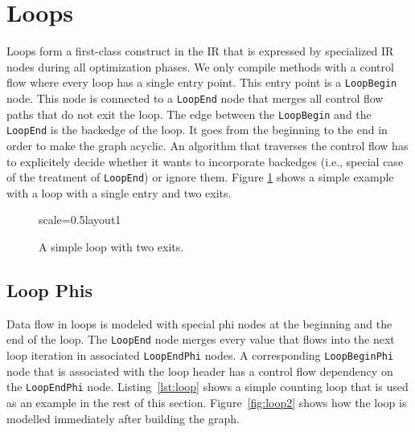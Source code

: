 \documentclass[twocolumn]{svjour3}
\newcommand\nodename[1]{\texttt{#1}}
\begin{document}
\section{Loops}
\label{sec:loops}
Loops form a first-class construct in the IR that is expressed by specialized IR nodes during all optimization phases.
We only compile methods with a control flow where every loop has a single entry point.
This entry point is a \nodename{LoopBegin} node.
This node is connected to a \nodename{LoopEnd} node that merges all control flow paths that do not exit the loop.
The edge between the \nodename{LoopBegin} and the \nodename{LoopEnd} is the backedge of the loop.
It goes from the beginning to the end in order to make the graph acyclic.
An algorithm that traverses the control flow has to explicitely decide whether it wants to incorporate backedges (i.e., special case of the treatment of \nodename{LoopEnd}) or ignore them.
Figure \ref{fig:loop1} shows a simple example with a loop with a single entry and two exits.

\begin{figure}[ht]
  \centering
\begin{digraphenv}{scale=0.5}{layout1}
\end{digraphenv}
  \caption{A simple loop with two exits.}
  \label{fig:loop1}
\end{figure}

\subsection{Loop Phis}
Data flow in loops is modeled with special phi nodes at the beginning and the end of the loop.
The \nodename{LoopEnd} node merges every value that flows into the next loop iteration in associated \nodename{LoopEndPhi} nodes.
A corresponding \nodename{LoopBeginPhi} node that is associated with the loop header has a control flow dependency on the \nodename{LoopEndPhi} node.
Listing~\ref{lst:loop} shows a simple counting loop that is used as an example in the rest of this section.
Figure~\ref{fig:loop2} shows how the loop is modelled immediately after building the graph.
\end{document}
